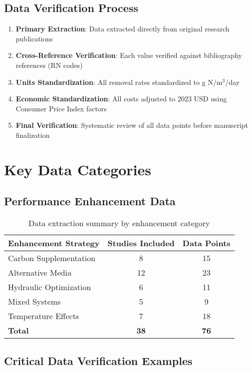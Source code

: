 \documentclass[12pt,a4paper]{article}
\begin{document}
\subsection{Data Verification Process}
\begin{enumerate}[leftmargin=*]
\item \textbf{Primary Extraction}: Data extracted directly from original research publications
\item \textbf{Cross-Reference Verification}: Each value verified against bibliography references (RN codes)
\item \textbf{Units Standardization}: All removal rates standardized to g N/m$^3$/day
\item \textbf{Economic Standardization}: All costs adjusted to 2023 USD using Consumer Price Index factors
\item \textbf{Final Verification}: Systematic review of all data points before manuscript finalization
\end{enumerate}

\section{Key Data Categories}

\subsection{Performance Enhancement Data}
\begin{table}[h]
\centering
\begin{tabular}{lcc}
\toprule
\textbf{Enhancement Strategy} & \textbf{Studies Included} & \textbf{Data Points} \\
\midrule
Carbon Supplementation & 8 & 15 \\
Alternative Media & 12 & 23 \\
Hydraulic Optimization & 6 & 11 \\
Mixed Systems & 5 & 9 \\
Temperature Effects & 7 & 18 \\
\midrule
\textbf{Total} & \textbf{38} & \textbf{76} \\
\bottomrule
\end{tabular}
\caption{Data extraction summary by enhancement category}
\end{table}

\subsection{Critical Data Verification Examples}
\end{document}
